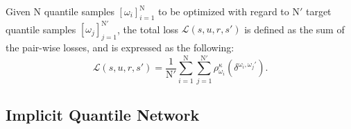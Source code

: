 \documentclass{article}
\newcommand{\state}{s}
\newcommand{\action}{u}
\newcommand{\reward}{r}
\newcommand{\tderror}{\delta}
\newcommand{\asymmetrichuberloss}{\rho}
\newcommand{\loss}{\mathcal{L}}
\newcommand{\quantile}{\omega}
\newcommand{\numberofquantiles}{\mathrm{N}}
\newcommand{\numberofquantilesamples}{\mathrm{N}'}
\begin{document}
Given $\numberofquantiles{}$ quantile samples $[\quantile{}_i]^\numberofquantiles_{i=1}$ to be optimized with regard to $\numberofquantilesamples$  target quantile samples $[\quantile{}_j]^{\numberofquantilesamples}_{j=1}$, the total loss $\loss{}(\state{},\action{},\reward{},\state{}')$  is defined as the sum of the pair-wise losses, and is expressed as the following:
\begin{equation}
\loss{}(\state{},\action{},\reward{},\state{}')=\frac{1}{\numberofquantilesamples{}}\sum^{\numberofquantiles{}}_{i=1}\sum^{\numberofquantilesamples{}}_{j=1}\asymmetrichuberloss{}^\kappa_{\quantile{}_i}(\tderror^{\quantile{}_i,\quantile{}_j'}).
\label{eq:total_qr_loss}
\end{equation}



\subsection{Implicit Quantile Network}
\label{subsec:background_implicit_quantile_network}
\end{document}
